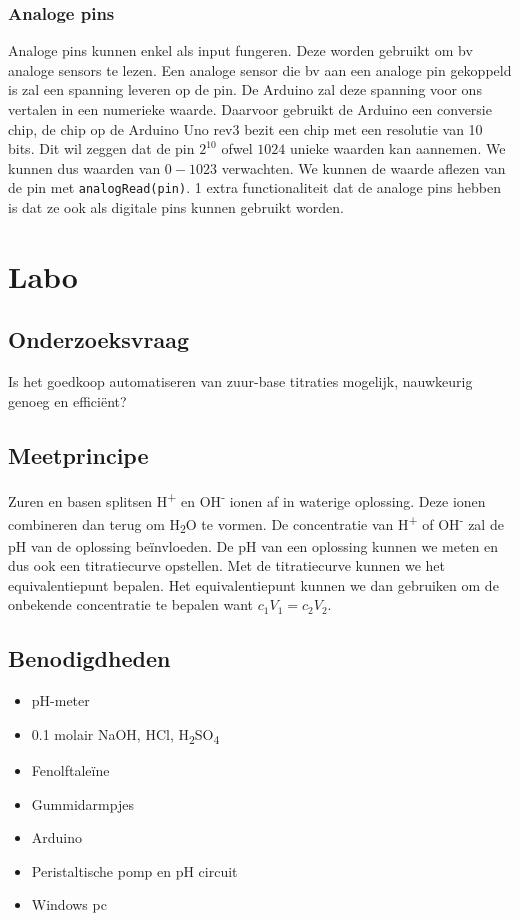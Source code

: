 \documentclass[11pt]{report}
\newcommand{\code}[1]{{\texttt{#1}}}
\begin{document}
\subsection{Analoge pins}
Analoge pins kunnen enkel als input fungeren. Deze worden gebruikt om bv analoge sensors te lezen. Een analoge sensor die bv aan een analoge pin gekoppeld is zal een spanning leveren op de pin. De Arduino zal deze spanning voor ons vertalen in een numerieke waarde. Daarvoor gebruikt de Arduino een conversie chip, de chip op de Arduino Uno rev3 bezit een chip met een resolutie van 10 bits. Dit wil zeggen dat de pin $2^{10}$ ofwel $1024$ unieke waarden kan aannemen. We kunnen dus waarden van $0-1023$ verwachten. We kunnen de waarde aflezen van de pin met \code{analogRead(pin)}. 1 extra functionaliteit dat de analoge pins hebben is dat ze ook als digitale pins kunnen gebruikt worden.

\chapter{Labo}
\section{Onderzoeksvraag}
Is het goedkoop automatiseren van zuur-base titraties mogelijk, nauwkeurig genoeg en efficiënt?

\section{Meetprincipe}
Zuren en basen splitsen H\textsuperscript{+} en OH\textsuperscript{-} ionen af in waterige oplossing. Deze ionen combineren dan terug om H\textsubscript{2}O te vormen. De concentratie van H\textsuperscript{+} of OH\textsuperscript{-} zal de pH van de oplossing beïnvloeden. De pH van een oplossing kunnen we meten en dus ook een titratiecurve opstellen. Met de titratiecurve kunnen we het equivalentiepunt bepalen. Het equivalentiepunt kunnen we dan gebruiken om de onbekende concentratie te bepalen want $c_1V_1 = c_2V_2$.

\section{Benodigdheden}
\begin{itemize}
    \item pH-meter
    \item 0.1 molair NaOH, HCl, H\textsubscript{2}SO\textsubscript{4}
    \item Fenolftaleïne
    \item Gummidarmpjes
    \item Arduino
    \item Peristaltische pomp en pH circuit
    \item Windows pc
\end{itemize}
\end{document}
